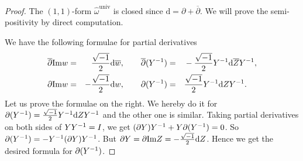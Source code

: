 \begin{proof}
The $(1,1)$-form $\hat{\omega}^{\mathrm{univ}}$ is  closed since $\mathrm{d} = \partial + \overline{\partial}$. We will prove the semi-positivity by direct computation.

   
We have the following formulae for partial derivatives
  \begin{equation*}    
    \begin{aligned}
      \overline\partial \mathrm{Im} w &=& \frac{\sqrt{-1}}{2} \mathrm{d}\overline w, \qquad     
      \overline\partial (Y^{-1}) &=&& -\frac{\sqrt{-1}}{2} Y^{-1} \mathrm{d} \overline Z
      Y^{-1},\\
      \partial \mathrm{Im} w &=& -\frac{\sqrt{-1}}{2} \mathrm{d} w,\qquad
      \partial (Y^{-1}) &=&& \frac{\sqrt{-1}}{2} Y^{-1} \mathrm{d}  Z Y^{-1}.
    \end{aligned}
  \end{equation*}
Let us prove the formulae on the right. We hereby do it for $\partial (Y^{-1}) = \frac{\sqrt{-1}}{2} Y^{-1} \mathrm{d}  Z Y^{-1}$ and the other one is similar. Taking partial derivatives on both sides of $Y Y^{-1} = I$, we get $(\partial Y)Y^{-1} + Y \partial (Y^{-1}) = 0$. So $\partial (Y^{-1}) = - Y^{-1}(\partial Y)Y^{-1}$. But $\partial Y = \partial \mathrm{Im}Z = - \frac{\sqrt{-1}}{2}\mathrm{d} Z$. Hence we get the desired formula for $\partial (Y^{-1})$.
  

\end{proof}
